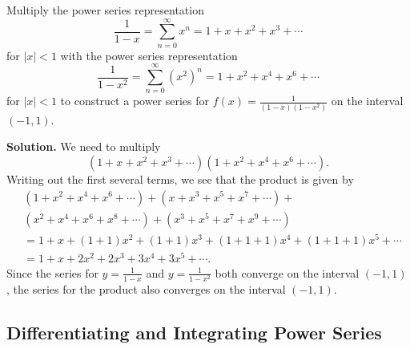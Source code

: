 \documentclass{report}
\begin{document}
    \bigbreak \noindent 
    \begin{eg}
        Multiply the power series representation
        \[
        \frac{1}{1 - x} = \sum_{n=0}^{\infty} x^n = 1 + x + x^2 + x^3 + \cdots
        \]
        for \( |x| < 1 \) with the power series representation
        \[
        \frac{1}{1 - x^2} = \sum_{n=0}^{\infty} (x^2)^n = 1 + x^2 + x^4 + x^6 + \cdots
        \]
        for \( |x| < 1 \) to construct a power series for \( f(x) = \frac{1}{(1 - x)(1 - x^2)} \) on the interval \( (-1, 1) \).
    \end{eg}
    \bigbreak \noindent 
    \textbf{Solution.} 
    We need to multiply
    \[
    (1 + x + x^2 + x^3 + \cdots)(1 + x^2 + x^4 + x^6 + \cdots).
    \]
    Writing out the first several terms, we see that the product is given by
    \[
    \begin{aligned}
    &(1 + x^2 + x^4 + x^6 + \cdots) + (x + x^3 + x^5 + x^7 + \cdots) + \\
    &(x^2 + x^4 + x^6 + x^8 + \cdots) + (x^3 + x^5 + x^7 + x^9 + \cdots) \\
    &= 1 + x + (1 + 1)x^2 + (1 + 1)x^3 + (1 + 1 + 1)x^4 + (1 + 1 + 1)x^5 + \cdots \\
    &= 1 + x + 2x^2 + 2x^3 + 3x^4 + 3x^5 + \cdots.
    \end{aligned}
    \]
    Since the series for \( y = \frac{1}{1 - x} \) and \( y = \frac{1}{1 - x^2} \) both converge on the interval \( (-1, 1) \), the series for the product also converges on the interval \( (-1, 1) \).


    \pagebreak \bigbreak \noindent 
    \subsection*{Differentiating and Integrating Power Series}
    \bigbreak \noindent 

    
    

    

    
    


    

    
    


        
        


    


    
    
    
    
\end{document}
